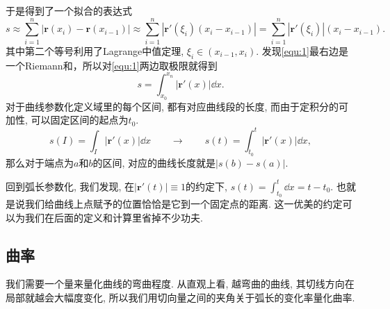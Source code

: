 \documentclass[./main.tex]{subfiles}
\begin{document}
\begin{figure}[!ht]
    \centering
\end{figure}
于是得到了一个拟合的表达式
\begin{equation}\label{equ:1}
    s\approx\sum_{i=1}^n |\mathbf{r}(x_i)-\mathbf{r}(x_{i-1})|\approx\sum_{i=1}^n |\mathbf{r}'(\xi_i)(x_i-x_{i-1})|=\sum_{i=1}^n |\mathbf{r}'(\xi_i)|(x_i-x_{i-1}).
\end{equation}
其中第二个等号利用了Lagrange中值定理, \(\xi_i\in(x_{i-1},x_i)\). 发现\eqref{equ:1}最右边是一个Riemann和，所以对\eqref{equ:1}两边取极限就得到
\begin{equation}\label{equ:2}
    s=\int_{x_0}^{x_n}|\mathbf{r}'(x)|\dd x.
\end{equation}
对于曲线参数化定义域里的每个区间, 都有对应曲线段的长度, 而由于定积分的可加性, 可以固定区间的起点为\(t_0\).
\[
    s(I)=\int_I|\mathbf{r}'(x)|\dd x\qquad\longrightarrow\qquad s(t)=\int_{t_0}^t|\mathbf{r}'(x)|\dd x,
\]
那么对于端点为\(a\)和\(b\)的区间, 对应的曲线长度就是\(|s(b)-s(a)|\).

回到弧长参数化, 我们发现, 在\(|\mathbf{r}'(t)|\equiv1\)的约定下, \(s(t)=\int_{t_0}^t\dd x=t-t_0\). 也就是说我们给曲线上点赋予的位置恰恰是它到一个固定点的距离. 这一优美的约定可以为我们在后面的定义和计算里省掉不少功夫.
\subsection{曲率}
我们需要一个量来量化曲线的弯曲程度. 从直观上看, 越弯曲的曲线, 其切线方向在局部就越会大幅度变化, 所以我们用切向量之间的夹角关于弧长的变化率量化曲率.
\end{document}

